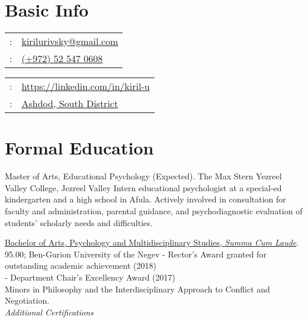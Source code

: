 \setLTR
\maketitle
\section{Basic Info}
\begin{minipage}[t]{.5\linewidth}
\begin{tabular}{rp{.75\linewidth}}
\baselineskip=20pt
\email{} :   & \href{mailto:kirilurivsky@gmail.com}{kirilurivsky@gmail.com}\\
\phone{} : &\href{tel:972525470608}{(+972) 52 547 0608} \\
\end{tabular}
\end{minipage}
\begin{minipage}[t]{.5\linewidth}
\begin{tabular}{rl}
\linkedin{} : &\href{https://www.linkedin.com/in/kiril-u}{https://linkedin.com/in/kiril-u}\\
\location{} : &\href{https://goo.gl/maps/MSacjpSy7vZSKykP7}{Ashdod, South District}                                                                          
\end{tabular}
\end{minipage}



% 

\section{Formal Education}

{Master of Arts, Educational Psychology (Expected). The Max Stern Yezreel Valley College, Jezreel Valley}
{Intern educational psychologist at a special-ed kindergarten and a high school in Afula. Actively involved in consultation for faculty and administration, parental guidance, and psychodiagnostic evaluation of students' scholarly needs and difficulties.}
{}

{\href{https://www.dropbox.com/s/pcm0mybvgi85ma0/BA-Psych.pdf?dl=0}{Bachelor of Arts, Psychology and Multidisciplinary Studies, \textit{Summa Cum Laude}}. 95.00; Ben-Gurion University of the Negev}
{- Rector's Award granted for outstanding academic achievement (2018) \\
- Department Chair’s Excellency Award (2017) \\
Minors in Philosophy and the Interdisciplinary Approach to Conflict and Negotiation.}
{}
\\
\textit{Additional Certifications} \\

